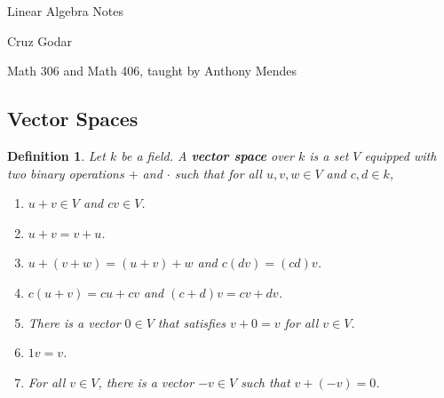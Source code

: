\documentclass{article}
\theoremstyle{colontheorem}
\newtheorem{definition}[theorem]{Definition}
\newenvironment{Def}
{
	\begin{mdframed}[backgroundcolor=DefGreen!10]
	\begin{definition}
}
{
	\end{definition}
	\end{mdframed}
	
	\vspace{.15in}
}
\begin{document}
\vspace*{.5in}

\begin{center}
	\Huge Linear Algebra Notes\\
	
	\vspace{.25in}
	
	\Large Cruz Godar\\
	
	\vspace{.25in}
	
	\normalsize Math 306 and Math 406, taught by Anthony Mendes
\end{center}

\vspace{.5in}





\begin{center}
	\section{Vector Spaces}
	\vspace{.1in}
\end{center}



\begin{Def}
	
	Let $k$ be a field. A \textbf{vector space} over $k$ is a set $V$ equipped with two binary operations $+$ and $\cdot$ such that for all $u,v,w \in V$ and $c,d \in k$,
	
	\begin{enumerate}
		
		\item $u+v \in V$ and $cv \in V$.
		\item $u+v = v+u$.
		\item $u+(v+w) = (u+v)+w$ and $c(dv) = (cd)v$.
		\item $c(u+v) = cu+cv$ and $(c+d)v = cv+dv$.
		\item There is a vector $0 \in V$ that satisfies $v+0 = v$ for all $v \in V$.
		\item $1v = v$.
		\item For all $v \in V$, there is a vector $-v \in V$ such that $v + (-v) = 0$.
		
	\end{enumerate}
	
\end{Def}
\end{document}
